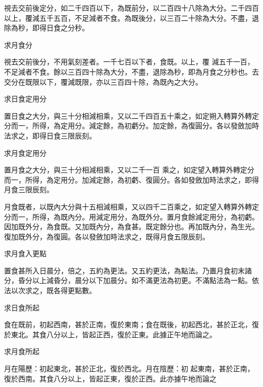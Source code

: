 \begin{pinyinscope}
 視去交前後定分，如二千四百以下，為既前分，以二百四十八除為大分。二千四百以上，覆減五千五百，不足減者不食。為既後分，以三百二十除為大分。不盡，退除為秒，即得日食之分秒。



 求月食分



 視去交前後分，不用氣刻差者。一千七百以下者，食既。以上，覆
 減五千一百，不足減者不食。餘以三百四十除為大分，不盡，退除為秒，即為月食之分秒也。去交分在既限以下，覆減既限，亦以三百四十除，為既內之大分。



 求日食定用分



 置日食之大分，與三十分相減相乘，又以二千四百五十乘之，如定朔入轉算外轉定分而一，所得，為定用分。減定餘，為初虧分。加定餘，為復圓分。各以發斂加時法求之，即得日食三限辰刻。



 求月食定用分



 置月食之大分，與三十分相減相乘，又以二千一百
 乘之，如定望入轉算外轉定分而一，所得，為定用分。加減定餘，為初虧、復圓分。各如發斂加時法求之，即得月食三限辰刻。



 月食既者，以既內大分與十五相減相乘，又以四千二百乘之，如定望入轉算外轉定分而一，所得，為既內分。用減定用分，為既外分。置月食餘減定用分，為初虧。因加既外分，為食既。又加既內分，為食甚。既定餘分也。再加既內分，為生光。復加既外分，為復圓。各以發斂加時法求之，既得月食五限辰刻。



 求月食入更點



 置食甚所入日晨分，倍之，五約為更法。又五約更法，為點法。乃置月食初末諸分，昏分以上減昏分，晨分以下加晨分。如不滿更法為初更。不滿點法為一點。依法以次求之，既各得更點數。



 求日食所起



 食在既前，初起西南，甚於正南，復於東南；食在既後，初起西北，甚於正北，復於東北。其食八分以上，皆起正西，復於正東。此據正午地而論之。



 求月食所起



 月在陽歷：初起東北，甚於正北，復於西北。月在陰歷：初
 起東南，甚於正南，復於西南。其食八分以上，皆起正東，復於正西。此亦據午地而論之




\end{pinyinscope}
